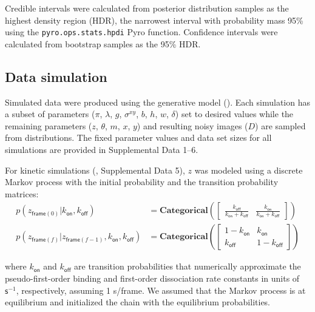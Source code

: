 Credible intervals were calculated from posterior distribution samples as the highest density region (HDR), the narrowest interval with probability mass 95\% using the \texttt{pyro.ops.stats.hpdi} Pyro function. Confidence intervals were calculated from bootstrap samples as the 95\% HDR.

\subsection{Data simulation}

Simulated data were produced using the generative model (). Each simulation has a subset of parameters ($\pi$, $\lambda$, $g$, $\sigma^{xy}$, $b$, $h$, $w$, $\delta$) set to desired values while  the remaining parameters ($z$, $\theta$, $m$, $x$, $y$) and resulting noisy images ($D$) are sampled from distributions. The fixed parameter values and data set sizes for all simulations are provided in Supplemental Data 1--6.

For kinetic simulations (, Supplemental Data 5), $z$ was modeled using a discrete Markov process with the initial probability and the transition probability matrices:
\begin{subequations}
\begin{align}
    p(z_{\mathsf{frame}(0)} | k_\mathsf{on}, k_\mathsf{off}) &= \mathbf{Categorical} \left( \begin{bmatrix} \frac{k_\mathsf{off}}{k_\mathsf{on} + k_\mathsf{off}} & \frac{k_\mathsf{on}}{k_\mathsf{on} + k_\mathsf{off}} \end{bmatrix} \right) \\
    p(z_{\mathsf{frame}(f)} | z_{\mathsf{frame}(f-1)}, k_\mathsf{on}, k_\mathsf{off}) &= \mathbf{Categorical} \left( \begin{bmatrix} 1 - k_\mathsf{on} & k_\mathsf{on} \\ k_\mathsf{off} & 1 - k_\mathsf{off} \end{bmatrix} \right)
\end{align}
\end{subequations}

\noindent
where $k_{\mathsf{on}}$ and $k_{\mathsf{off}}$ are transition probabilities that numerically approximate the pseudo-first-order binding and first-order dissociation rate constants in units of $\mathsf{s}^{-1}$, respectively, assuming 1 s/frame. We assumed that the Markov process is at equilibrium and initialized the chain with the equilibrium probabilities.

